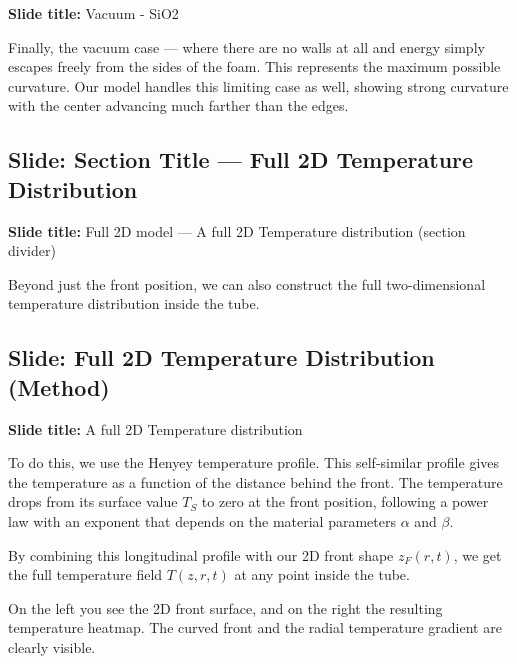 \documentclass[12pt, a4paper]{article}
\begin{document}
\begin{slidebox}
\textbf{Slide title:} Vacuum - SiO2
\end{slidebox}

Finally, the vacuum case --- where there are no walls at all and energy simply escapes freely from the sides of the foam. This represents the maximum possible curvature. Our model handles this limiting case as well, showing strong curvature with the center advancing much farther than the edges.

\subsection{Slide: Section Title --- Full 2D Temperature Distribution}

\begin{slidebox}
\textbf{Slide title:} Full 2D model --- A full 2D Temperature distribution (section divider)
\end{slidebox}

Beyond just the front position, we can also construct the full two-dimensional temperature distribution inside the tube.

\subsection{Slide: Full 2D Temperature Distribution (Method)}

\begin{slidebox}
\textbf{Slide title:} A full 2D Temperature distribution
\end{slidebox}

To do this, we use the Henyey temperature profile. This self-similar profile gives the temperature as a function of the distance behind the front. The temperature drops from its surface value $T_S$ to zero at the front position, following a power law with an exponent that depends on the material parameters $\alpha$ and $\beta$.

By combining this longitudinal profile with our 2D front shape $z_F(r,t)$, we get the full temperature field $T(z, r, t)$ at any point inside the tube.

On the left you see the 2D front surface, and on the right the resulting temperature heatmap. The curved front and the radial temperature gradient are clearly visible.
\end{document}
